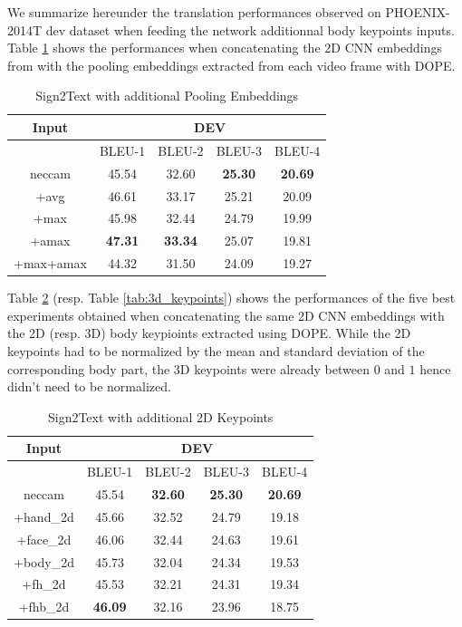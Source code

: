 \documentclass[final]{cvpr}
\begin{document}
We summarize hereunder the translation performances observed on PHOENIX-2014T dev dataset when feeding the network additionnal body keypoints inputs. Table \ref{tab:embeddings} shows the performances when concatenating the 2D CNN embeddings from \cite{neccam} with the pooling embeddings extracted from each video frame with DOPE.
\begin{table}[H]
\centering
\def\arraystretch{0.9}
\begin{tabular}{*5c}
	\toprule
	Input &  \multicolumn{4}{c}{DEV}\\
	\midrule
	{}   & BLEU-1   & BLEU-2    & BLEU-3   & BLEU-4\\
	neccam   &  45.54 & 32.60  & \textbf{25.30}  & \textbf{20.69}\\
	+avg   &  46.61 & 33.17   & 25.21  & 20.09\\
	+max   &  45.98  &  32.44   & 24.79  & 19.99\\
	+amax  &  \textbf{47.31} &  \textbf{33.34}   & 25.07  & 19.81\\
	+max+amax  &  44.32 & 31.50  & 24.09  & 19.27\\
	\bottomrule
\end{tabular}
\caption{Sign2Text with additional Pooling Embeddings}
\label{tab:embeddings}
\end{table}
Table \ref{tab:2d_keypoints} (resp. Table \ref{tab:3d_keypoints}) shows the performances of the five best experiments obtained when concatenating the same 2D CNN embeddings with the 2D (resp. 3D) body keypioints extracted using DOPE. While the 2D keypoints had to be normalized by the mean and standard deviation of the corresponding body part, the 3D keypoints were already between $0$ and $1$ hence didn't need to be normalized. 
\begin{table}[h]
	\centering
	\def\arraystretch{0.9}
	\begin{tabular}{*5c}
		\toprule
		Input &  \multicolumn{4}{c}{DEV}\\
		\midrule
		{}   & BLEU-1   & BLEU-2    & BLEU-3   & BLEU-4\\
		neccam   &  45.54 & \textbf{32.60}  & \textbf{25.30}  & \textbf{20.69}\\
		+hand\_2d   &  45.66 & 32.52   & 24.79  & 19.18\\
		+face\_2d   &  46.06  &  32.44   & 24.63  & 19.61\\
		+body\_2d   &  45.73 &  32.04   & 24.34  & 19.53\\	
		+fh\_2d\footnotemark[3]  &  45.53 &  32.21  & 24.31  & 19.34\\	
		+fhb\_2d\footnotemark[4] &  \textbf{46.09} &  32.16   & 23.96  & 18.75\\	
		\bottomrule
	\end{tabular}
	\caption{Sign2Text with additional 2D Keypoints}
	\label{tab:2d_keypoints}
\end{table}
\end{document}

